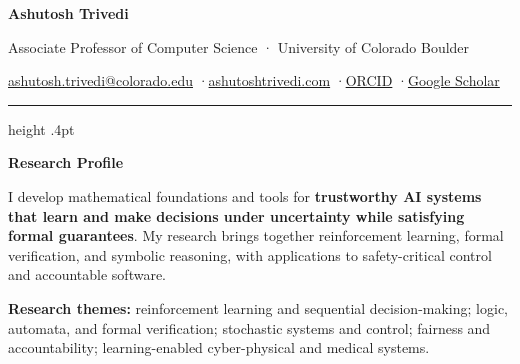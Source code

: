 \documentclass[10pt,letterpaper]{article}
\newcommand{\cvsection}[1]{%
  \par\vspace{7bp}\hrule height .4pt\vspace{5.2bp}%
  {\fontsize{11.5}{13.2}\selectfont\bfseries #1\par}\vspace{3bp}}
\begin{document}
\color{ink}\fontsize{10.2}{12.35}\selectfont\raggedright

{\fontsize{22}{24}\selectfont\bfseries Ashutosh Trivedi\par}
\vspace{2bp}
{\fontsize{10}{11.8}\selectfont Associate Professor of Computer Science · University of Colorado Boulder\par}
\vspace{1.5bp}
\href{mailto:ashutosh.trivedi@colorado.edu}{ashutosh.trivedi@colorado.edu}
\quad·\quad \href{https://ashutoshtrivedi.com}{ashutoshtrivedi.com}
\quad·\quad \href{https://orcid.org/0000-0001-9346-0126}{ORCID}
\quad·\quad \href{https://tinyurl.com/9WDXyy4AAAAJ}{Google Scholar}

\cvsection{Research Profile}
I develop mathematical foundations and tools for \textbf{trustworthy AI systems that learn and make decisions under uncertainty while satisfying formal guarantees}. My research brings together reinforcement learning, formal verification, and symbolic reasoning, with applications to safety-critical control and accountable software.

\vspace{2bp}
{\fontsize{9.2}{11.1}\selectfont
\textbf{Research themes:} reinforcement learning and sequential decision-making; logic, automata, and formal verification; stochastic systems and control; fairness and accountability; learning-enabled cyber-physical and medical systems.\par}
\end{document}

